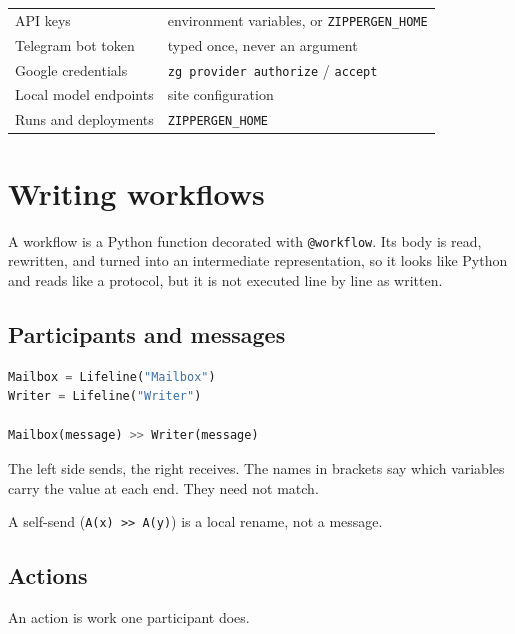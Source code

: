 \documentclass[11pt,a4paper]{article}
\begin{document}
\begin{center}
\begin{tabularx}{0.95\linewidth}{@{}lX@{}}
\toprule
API keys & environment variables, or \texttt{ZIPPERGEN\_HOME} \\
Telegram bot token & typed once, never an argument \\
Google credentials & \texttt{zg provider authorize} / \texttt{accept} \\
Local model endpoints & site configuration \\
Runs and deployments & \texttt{ZIPPERGEN\_HOME} \\
\bottomrule
\end{tabularx}
\end{center}

\section{Writing workflows}

A workflow is a Python function decorated with \texttt{@workflow}. Its body is
read, rewritten, and turned into an intermediate representation, so it looks
like Python and reads like a protocol, but it is not executed line by line as
written.

\subsection{Participants and messages}

\begin{lstlisting}[language=Python]
Mailbox = Lifeline("Mailbox")
Writer = Lifeline("Writer")

Mailbox(message) >> Writer(message)
\end{lstlisting}

The left side sends, the right receives. The names in brackets say which
variables carry the value at each end. They need not match.

A self-send (\texttt{A(x) >> A(y)}) is a local rename, not a message.

\subsection{Actions}

An action is work one participant does.
\end{document}

